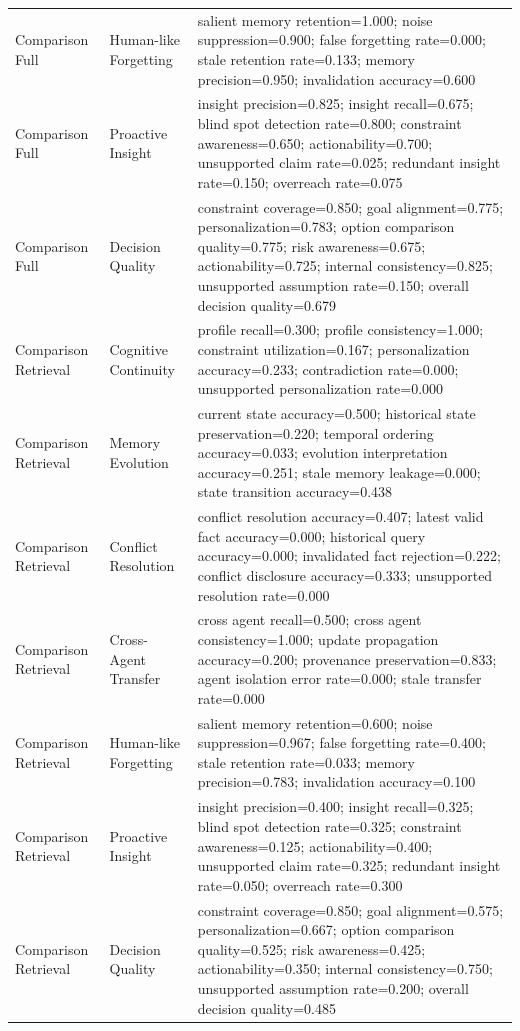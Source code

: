 \begin{longtable}{p{}p{}p{}}
Comparison Full & Human-like Forgetting & salient memory retention=1.000; noise suppression=0.900; false forgetting rate=0.000; stale retention rate=0.133; memory precision=0.950; invalidation accuracy=0.600 \\
Comparison Full & Proactive Insight & insight precision=0.825; insight recall=0.675; blind spot detection rate=0.800; constraint awareness=0.650; actionability=0.700; unsupported claim rate=0.025; redundant insight rate=0.150; overreach rate=0.075 \\
Comparison Full & Decision Quality & constraint coverage=0.850; goal alignment=0.775; personalization=0.783; option comparison quality=0.775; risk awareness=0.675; actionability=0.725; internal consistency=0.825; unsupported assumption rate=0.150; overall decision quality=0.679 \\
Comparison Retrieval & Cognitive Continuity & profile recall=0.300; profile consistency=1.000; constraint utilization=0.167; personalization accuracy=0.233; contradiction rate=0.000; unsupported personalization rate=0.000 \\
Comparison Retrieval & Memory Evolution & current state accuracy=0.500; historical state preservation=0.220; temporal ordering accuracy=0.033; evolution interpretation accuracy=0.251; stale memory leakage=0.000; state transition accuracy=0.438 \\
Comparison Retrieval & Conflict Resolution & conflict resolution accuracy=0.407; latest valid fact accuracy=0.000; historical query accuracy=0.000; invalidated fact rejection=0.222; conflict disclosure accuracy=0.333; unsupported resolution rate=0.000 \\
Comparison Retrieval & Cross-Agent Transfer & cross agent recall=0.500; cross agent consistency=1.000; update propagation accuracy=0.200; provenance preservation=0.833; agent isolation error rate=0.000; stale transfer rate=0.000 \\
Comparison Retrieval & Human-like Forgetting & salient memory retention=0.600; noise suppression=0.967; false forgetting rate=0.400; stale retention rate=0.033; memory precision=0.783; invalidation accuracy=0.100 \\
Comparison Retrieval & Proactive Insight & insight precision=0.400; insight recall=0.325; blind spot detection rate=0.325; constraint awareness=0.125; actionability=0.400; unsupported claim rate=0.325; redundant insight rate=0.050; overreach rate=0.300 \\
Comparison Retrieval & Decision Quality & constraint coverage=0.850; goal alignment=0.575; personalization=0.667; option comparison quality=0.525; risk awareness=0.425; actionability=0.350; internal consistency=0.750; unsupported assumption rate=0.200; overall decision quality=0.485 \\

\end{longtable}
